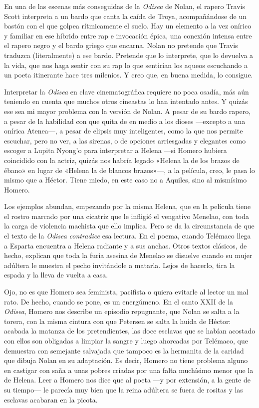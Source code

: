 En una de las escenas más conseguidas de la \emph{Odisea} de Nolan, el rapero Travis Scott interpreta a un bardo que canta la caída de Troya, acompañándose de un bastón con el que golpea rítmicamente el suelo. Hay un elemento a la vez onírico y familiar en ese híbrido entre rap e invocación épica, una conexión intensa entre el rapero negro y el bardo griego que encarna. Nolan no pretende que Travis traduzca (literalmente) a ese bardo. Pretende que lo interprete, que lo devuelva a la vida, que nos haga sentir con su rap lo que sentirían los aqueos escuchando a un poeta itinerante hace tres milenios. Y creo que, en buena medida, lo consigue. 

Interpretar la \emph{Odisea} en clave cinematográfica requiere no poca osadía, más aún teniendo en cuenta que muchos otros cineastas lo han intentado antes. Y quizás ese sea mi mayor problema con la versión de Nolan. A pesar de su bardo rapero, a pesar de la habilidad con que quita de en medio a los dioses ---excepto a una onírica Atenea---, a pesar de elipsis muy inteligentes, como la que nos permite escuchar, pero no ver, a las sirenas, o de opciones arriesgadas y elegantes como escoger a Lupita Nyong'o para interpretar a Helena ---si Homero hubiera coincidido con la actriz, quizás nos habría legado «Helena la de los brazos de ébano» en lugar de «Helena la de blancos brazos»---, a la película, creo, le pasa lo mismo que a Héctor. Tiene miedo, en este caso no a Aquiles, sino al mismísimo Homero.

Los ejemplos abundan, empezando por la misma Helena, que en la película tiene el rostro marcado por una cicatriz que le infligió el vengativo Menelao, con toda la carga de violencia machista que ello implica. Pero se da la circunstancia de que el texto de la \emph{Odisea} \emph{contradice} esa lectura. En el poema, cuando Telémaco llega a Esparta encuentra a Helena radiante y a sus anchas. Otros textos clásicos, de hecho, explican que toda la furia asesina de Menelao se disuelve cuando su mujer adúltera le muestra el pecho invitándole a matarla. Lejos de hacerlo, tira la espada y la lleva de vuelta a casa.

Ojo, no es que Homero sea feminista, pacifista o quiera evitarle al lector un mal rato. De hecho, cuando se pone, es un energúmeno.
En el canto XXII de la \emph{Odisea}, Homero nos describe un episodio repugnante, que Nolan se salta a la torera, con la misma cintura con que Petersen se salta la huida de Héctor: acabada la matanza de los pretendientes, las doce esclavas que se habían acostado con ellos son obligadas a limpiar la sangre y luego ahorcadas por Telémaco, que demuestra con semejante salvajada que tampoco es la hermanita de la caridad que dibuja Nolan en su adaptación. Es decir, Homero no tiene problema alguno en castigar con saña a unas pobres criadas por una falta muchísimo menor que la de Helena. Leer a Homero nos dice que al poeta ---y por extensión, a la gente de su tiempo--- le parecía muy bien que la reina adúltera se fuera de rositas y las esclavas acabaran en la picota.


